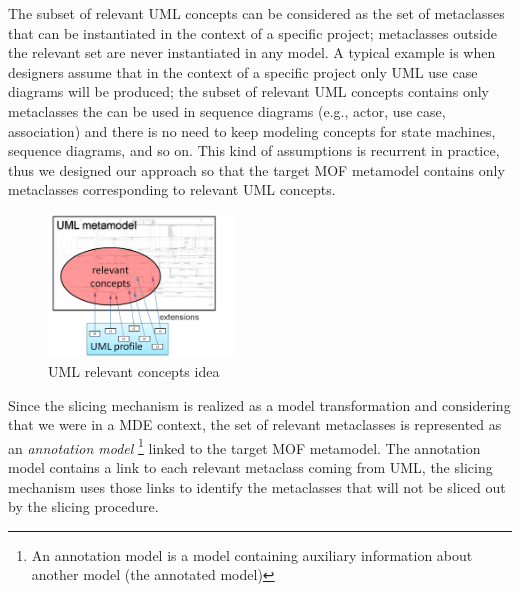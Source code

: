 The subset of relevant UML concepts can be considered as the set of metaclasses that can be instantiated
in the context of a specific project; metaclasses outside the relevant set are never instantiated in any model.
A typical example is when designers assume that in the context of a specific project only UML
use case diagrams will be produced; the subset of relevant UML concepts contains only metaclasses
the can be used in sequence diagrams (e.g., actor, use case, association) and there is no need to keep modeling concepts
for state machines, sequence diagrams, and so on.
This kind of assumptions is recurrent in practice, thus we designed our approach so that the target MOF metamodel contains only
metaclasses corresponding to relevant UML concepts.
%
\begin{figure}
	\vspace{-20pt}
	\begin{center}
	\includegraphics[width=0.44\textwidth]{figures/slicingIdea.png}
	\end{center}
	\caption{UML relevant concepts idea}
	\label{fig:slicingIdea}
	\vspace{-20pt}
\end{figure}
%

Since the slicing mechanism is realized as a model transformation and considering that we were in a MDE context, the set of relevant
metaclasses is represented as an \textit{annotation model}
\footnote{An annotation model is a model containing auxiliary information about another model (the annotated model)\cite{MCDFthesis}} linked to the target MOF metamodel. The annotation model contains a link to each relevant metaclass coming from UML, the slicing mechanism uses those links to identify the metaclasses that will not be sliced out by the slicing procedure.

